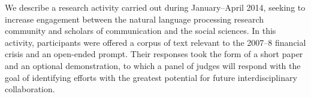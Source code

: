 We describe a research activity carried out during January--April 2014, seeking to increase engagement between the natural language processing research community and scholars of communication and the social sciences.  In this activity, participants were offered a corpus of text relevant to the 2007--8 financial crisis and an open-ended prompt.  Their responses took the form of a short paper and an optional demonstration, to which a panel of judges will respond with the goal of identifying efforts with the greatest potential for future interdisciplinary collaboration.
